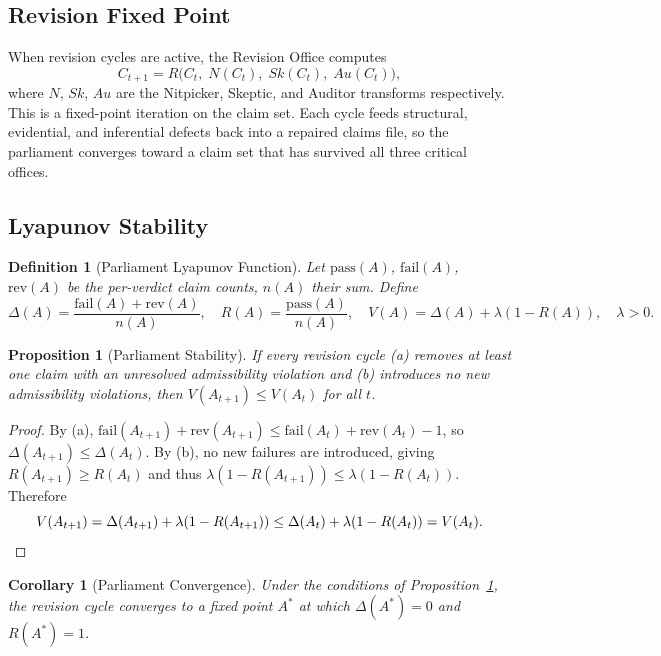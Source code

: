 \documentclass[12pt, a4paper]{article}
\newtheorem{definition}{Definition}[section]
\newtheorem{proposition}{Proposition}[section]
\newtheorem{corollary}{Corollary}[section]
\theoremstyle{principle}
\theoremstyle{definition}
\begin{document}
\subsection{Revision Fixed Point}

When revision cycles are active, the Revision Office computes
\[
C_{t+1} = R\bigl(C_t,\; N(C_t),\; Sk(C_t),\; Au(C_t)\bigr),
\]
where $N$, $Sk$, $Au$ are the Nitpicker, Skeptic, and Auditor transforms
respectively. This is a fixed-point iteration on the claim set. Each cycle feeds
structural, evidential, and inferential defects back into a repaired claims file,
so the parliament converges toward a claim set that has survived all three
critical offices.

\subsection{Lyapunov Stability}

\begin{definition}[Parliament Lyapunov Function]
Let $\mathrm{pass}(A)$, $\mathrm{fail}(A)$, $\mathrm{rev}(A)$ be the per-verdict
claim counts, $n(A)$ their sum. Define
\[
\Delta(A) = \frac{\mathrm{fail}(A) + \mathrm{rev}(A)}{n(A)},\quad
R(A) = \frac{\mathrm{pass}(A)}{n(A)},\quad
V(A) = \Delta(A) + \lambda(1 - R(A)),\quad \lambda > 0.
\]
\end{definition}

\begin{proposition}[Parliament Stability]
\label{prop:stability}
If every revision cycle (a) removes at least one claim with an unresolved
admissibility violation and (b) introduces no new admissibility violations,
then $V(A_{t+1}) \leq V(A_t)$ for all $t$.
\end{proposition}

\begin{proof}
By (a), $\mathrm{fail}(A_{t+1}) + \mathrm{rev}(A_{t+1})
\leq \mathrm{fail}(A_t) + \mathrm{rev}(A_t) - 1$,
so $\Delta(A_{t+1}) \leq \Delta(A_t)$.
By (b), no new failures are introduced, giving
$R(A_{t+1}) \geq R(A_t)$ and thus
$\lambda(1 - R(A_{t+1})) \leq \lambda(1 - R(A_t))$.
Therefore
\[
V(A_{t+1}) = \Delta(A_{t+1}) + \lambda(1 - R(A_{t+1}))
           \leq \Delta(A_t) + \lambda(1 - R(A_t)) = V(A_t). \qedhere
\]
\end{proof}

\begin{corollary}[Parliament Convergence]
Under the conditions of Proposition~\ref{prop:stability}, the revision cycle
converges to a fixed point $A^*$ at which $\Delta(A^*) = 0$ and $R(A^*) = 1$.
\end{corollary}
\end{document}
